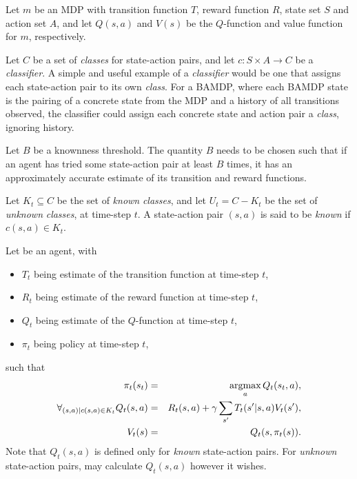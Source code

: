\begin{defn}
Let $m$ be an MDP with transition function $T$, reward function $R$, state set $S$ and action set $A$, and let $Q(s,a)$ and $V(s)$ be the $Q$-function and value function for $m$, respectively.
\end{defn}

\begin{defn}
Let $C$ be a set of \emph{classes} for state-action pairs, and let $c:S\times A\rightarrow C$ be a \emph{classifier}. A simple and useful example of a \emph{classifier} would be one that assigns each state-action pair to its own \emph{class}. For a BAMDP, where each BAMDP state is the pairing of a concrete state from the MDP and a history of all transitions observed, the classifier could assign each concrete state and action pair a \emph{class}, ignoring history.
\end{defn}

\begin{defn}
Let $B$ be a knownness threshold. The quantity $B$ needs to be chosen such that if an agent has tried some state-action pair at least $B$ times, it has an approximately accurate estimate of its transition and reward functions.
\end{defn}

\begin{defn}
Let $K_t \subseteq C$ be the set of \emph{known} \emph{classes}, and let $U_t = C - K_t$ be the set of \emph{unknown} \emph{classes}, at time-step $t$. A state-action pair $(s,a)$ is said to be \emph{known} if $c(s,a) \in K_t$.
\end{defn}

\begin{defn}
Let \A be an agent, with
\begin{itemize}
\item
$T_t$ being \As estimate of the transition function at time-step $t$,
\item
$R_t$ being \As estimate of the reward function at time-step $t$,
\item
$Q_t$ being \As estimate of the $Q$-function at time-step $t$,
\item
$\pi_t$ being \As policy at time-step $t$, 
\end{itemize}
such that
\begin{eqnarray}
\pi_t(s_t) &=& \argmax_a Q_t(s_t,a),\\
\forall_{(s,a) | c(s,a)\in K_t} Q_t(s,a) &=& R_t(s,a) + \gamma \sum_{s'} T_t(s'|s,a) V_t(s'),\\
V_t(s) &=& Q_t(s,\pi_t(s)).
\end{eqnarray}
Note that $Q_t(s,a)$ is defined only for \emph{known} state-action pairs. For \emph{unknown} state-action pairs, \A may calculate $Q_t(s,a)$ however it wishes.
\end{defn}


